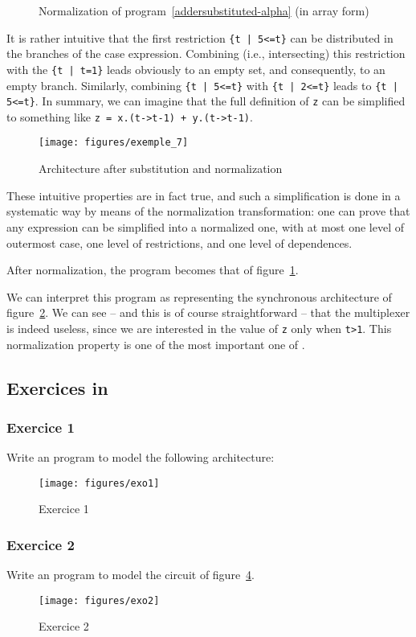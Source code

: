 \begin{figure}[htbp]

\caption{Normalization of program~\ref{addersubstituted-alpha} (in
array form)}
\label{addernormalized-alpha}
\end{figure}

It is rather intuitive that the first restriction {\tt \{t | 5<=t\}}
can be distributed in the branches of the case expression. Combining
(i.e., intersecting) this restriction with the {\tt \{t | t=1\}} leads
obviously to an empty set, and consequently, to an empty
branch. Similarly, combining {\tt \{t | 5<=t\}} with {\tt \{t | 2<=t\}}
leads to {\tt \{t | 5<=t\}}. In summary, we can imagine that the full
definition of {\tt z} can be simplified to something like {\tt z =
x.(t->t-1) + y.(t->t-1)}.

\begin{figure}[htbp]
\centerline{\texttt{[image: figures/exemple\_7]}}
\caption{Architecture after substitution and normalization}
\label{addernormalized}
\end{figure}
These intuitive properties are in fact true, and such a simplification
is done in a systematic way by means of the normalization
transformation: one can prove that any expression can be simplified
into a normalized one, with at most one level of outermost case, one
level of restrictions, and one level of
dependences.

After normalization, the program becomes that of
figure~\ref{addernormalized-alpha}.

We can interpret this program as representing the synchronous
architecture of figure~\ref{addernormalized}.
We can see -- and this is of course straightforward -- that the 
multiplexer is indeed useless, since we are interested in the 
value of {\tt z} only when {\tt t>1}. This normalization 
property is one of the most important one of {\alfa}. 

\subsection*{Exercices in {\mma}}
\subsubsection*{Exercice 1}
Write an {\alfa} program to model the 
following
architecture:
\begin{figure}[htbp]
\centerline{\texttt{[image: figures/exo1]}}
\caption{Exercice 1}
\label{exo1}
\end{figure}
\subsubsection*{Exercice 2}
Write an {\alfa} program to model 
the circuit of figure~\ref{exo2}.
\begin{figure}[htbp]
\centerline{\texttt{[image: figures/exo2]}}
\caption{Exercice 2}\label{exo2}
\end{figure}
